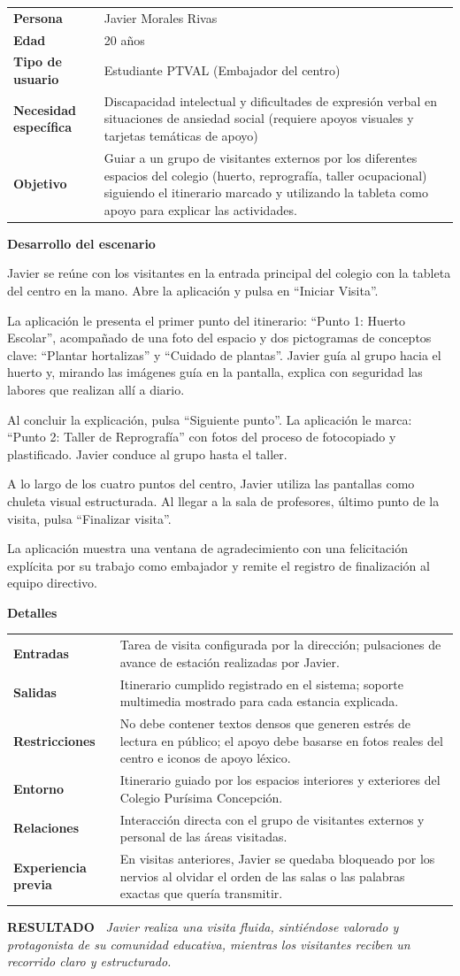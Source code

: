 \documentclass[11pt,a4paper]{article}
\makeatletter
\newcommand{\escenariocard}[6]{%
\needspace{10\baselineskip}
\begin{tcolorbox}[breakable,enhanced,colback=white,colframe=brandgreen,boxrule=0.8pt,arc=3pt,
 left=9pt,right=9pt,top=7pt,bottom=7pt,before skip=10pt,after skip=10pt,
 title={\textbf{\color{white}ESCENARIO #1} \\[1pt] {\small\color{tintgreen}#2}},
 colbacktitle=brandgreen,coltitle=white,fonttitle=\bfseries,boxed title style={colframe=brandgreen}]
{\setlength{\parskip}{0pt}\renewcommand{\arraystretch}{1.35}\rowcolors{1}{tintgreen}{white}\arrayrulecolor{white}
\begin{tabular}{@{\hspace{4pt}}>{\bfseries\color{brandgreen}}p{3.4cm}p{11.4cm}@{}}
#3 \\
\end{tabular}}
\vspace{6pt}
\textbf{\color{brandblue}Desarrollo del escenario}\par\vspace{2pt}
#4
\par\vspace{4pt}
\textbf{\color{brandblue}Detalles}\par\vspace{2pt}
{\setlength{\parskip}{0pt}\renewcommand{\arraystretch}{1.35}\rowcolors{1}{tintblue}{white}\arrayrulecolor{white}
\begin{tabular}{@{\hspace{4pt}}>{\bfseries\color{brandblue}}p{3.4cm}p{11.4cm}@{}}
#5 \\
\end{tabular}}
\vspace{6pt}
\begin{tcolorbox}[colback=tintblue,colframe=brandblue,boxrule=0pt,sharp corners,borderline west={3pt}{0pt}{brandblue},left=8pt,right=8pt,top=5pt,bottom=5pt]
\textbf{\small\color{brandblue}RESULTADO\ } {\small\itshape #6}
\end{tcolorbox}
\end{tcolorbox}
}
\makeatother
\begin{document}
\escenariocard{4}{Desempeño del rol de guía de visita para personas externas al centro}{%
Persona & Javier Morales Rivas \\
Edad & 20 años \\
Tipo de usuario & Estudiante PTVAL (Embajador del centro) \\
Necesidad específica & Discapacidad intelectual y dificultades de expresión verbal en situaciones de ansiedad social (requiere apoyos visuales y tarjetas temáticas de apoyo) \\
Objetivo & Guiar a un grupo de visitantes externos por los diferentes espacios del colegio (huerto, reprografía, taller ocupacional) siguiendo el itinerario marcado y utilizando la tableta como apoyo para explicar las actividades.
}{%
Javier se reúne con los visitantes en la entrada principal del colegio con la tableta del centro en la mano. Abre la aplicación y pulsa en ``Iniciar Visita''.

La aplicación le presenta el primer punto del itinerario: ``Punto 1: Huerto Escolar'', acompañado de una foto del espacio y dos pictogramas de conceptos clave: ``Plantar hortalizas'' y ``Cuidado de plantas''. Javier guía al grupo hacia el huerto y, mirando las imágenes guía en la pantalla, explica con seguridad las labores que realizan allí a diario.

Al concluir la explicación, pulsa ``Siguiente punto''. La aplicación le marca: ``Punto 2: Taller de Reprografía'' con fotos del proceso de fotocopiado y plastificado. Javier conduce al grupo hasta el taller.

A lo largo de los cuatro puntos del centro, Javier utiliza las pantallas como chuleta visual estructurada. Al llegar a la sala de profesores, último punto de la visita, pulsa ``Finalizar visita''.

La aplicación muestra una ventana de agradecimiento con una felicitación explícita por su trabajo como embajador y remite el registro de finalización al equipo directivo.
}{%
Entradas & Tarea de visita configurada por la dirección; pulsaciones de avance de estación realizadas por Javier. \\
Salidas & Itinerario cumplido registrado en el sistema; soporte multimedia mostrado para cada estancia explicada. \\
Restricciones & No debe contener textos densos que generen estrés de lectura en público; el apoyo debe basarse en fotos reales del centro e iconos de apoyo léxico. \\
Entorno & Itinerario guiado por los espacios interiores y exteriores del Colegio Purísima Concepción. \\
Relaciones & Interacción directa con el grupo de visitantes externos y personal de las áreas visitadas. \\
Experiencia previa & En visitas anteriores, Javier se quedaba bloqueado por los nervios al olvidar el orden de las salas o las palabras exactas que quería transmitir.
}{Javier realiza una visita fluida, sintiéndose valorado y protagonista de su comunidad educativa, mientras los visitantes reciben un recorrido claro y estructurado.}
\end{document}
